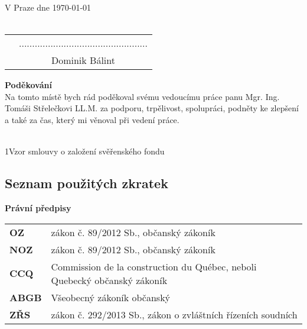 \documentclass{article}
\begin{document}
\noindent V Praze dne \today\\%
\vspace{10mm} \\
\begin{tabular}{p{6cm}c}
& ................................................. \\
& Dominik Bálint
\end{tabular}

\newpage

\thispagestyle{empty}

\vspace*{\fill}
\noindent \textbf{Poděkování} \\

	Na tomto místě bych rád poděkoval svému vedoucímu práce panu Mgr. Ing. 
Tomáši Střelečkovi LL.M. za podporu, trpělivost, spolupráci, podněty ke zlepšení a 
také za čas, který mi věnoval při vedení práce.

\vspace*{\fill}

\newpage
  \thispagestyle{Contents}
  \tableofcontents
  \listoffigures

\vspace*{0.5cm}
  
\\

\normalsize{1\hspace*{1.8em}Vzor smlouvy o založení svěřenského fondu}

\newpage
 
\begin{center}
\section{Seznam použitých zkratek}
\end{center}

\vspace{5 mm}

\textbf{Právní předpisy}

\vspace{5 mm}

\begin{tabular}{p{3cm}p{8cm}}
\textbf{OZ} & zákon č. 89/2012 Sb., občanský zákoník	 \\
\textbf{NOZ} & zákon č. 89/2012 Sb., občanský zákoník	 \\
\textbf{CCQ} & Commission de la construction du Québec, neboli Quebecký občanský zákoník \\
\textbf{ABGB} & Všeobecný zákoník občanský	 \\
\textbf{ZŘS} & zákon č. 292/2013 Sb., zákon o zvláštních řízeních soudních	 \\
\end{tabular}
\end{document}
